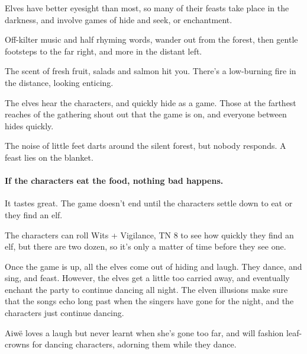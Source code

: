 Elves have better eyesight than most, so many of their feasts take place in the darkness, and involve games of hide and seek, or enchantment.

\begin{boxtext}

  Off-kilter music and half rhyming words, wander out from the forest, then gentle footsteps to the far right, and more in the distant left.

  The scent of fresh fruit, salads and salmon hit you.  There's a low-burning fire in the distance, looking enticing.

\end{boxtext}

The elves hear the characters, and quickly hide as a game.  Those at the farthest reaches of the gathering shout out that the game is on, and everyone between hides quickly.

\begin{boxtext}

  The noise of little feet darts around the silent forest, but nobody responds.
  A feast lies on the blanket.

\end{boxtext}

\paragraph{If the characters eat the food, nothing bad happens.}
It tastes great.
The game doesn't end until the characters settle down to eat or they find an elf.

The characters can roll Wits + Vigilance, TN 8 to see how quickly they find an elf, but there are two dozen, so it's only a matter of time before they see one.

Once the game is up, all the elves come out of hiding and laugh.  They dance, and sing, and feast.  However, the elves get a little too carried away, and eventually enchant the party to continue dancing all night.  The elven illusions make sure that the songs echo long past when the singers have gone for the night, and the characters just continue dancing.
 

Aiw\"{e} loves a laugh but never learnt when she's gone too far, and will fashion leaf-crowns for dancing characters, adorning them while they dance.


